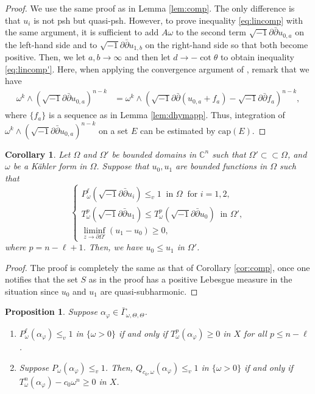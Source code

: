 \documentclass{amsart}
\numberwithin{equation}{section}
\theoremstyle{plain}
\newtheorem{cor}[equation]{Corollary}
\newtheorem{prop}[equation]{Proposition}
\theoremstyle{definition}
\theoremstyle{remark}
\newcommand{\delb}{\sqrt{-1}\partial\bar{\partial}}
\begin{document}
\begin{proof}
    We use the same proof as in Lemma \ref{lem:comp}. 
    The only difference is that $u_i$ is not psh but quasi-psh. However, to prove inequality \eqref{eq:lincomp} with the same argument, it is sufficient to add $A\omega$ to the second term $\delb u_{0,a}$ on the left-hand side and to $\delb u_{1,b}$ on the right-hand side so that both become positive. Then, we let $a,b\to\infty$ and then let $d\to-\cot\theta$ to obtain inequality \eqref{eq:lincomp'}. Here, when applying the convergence argument of \cite[Theorem 4.1]{BT}, remark that we have
    \begin{align*}
        \omega^k\wedge(\delb u_{0,a})^{n-k}
        &=\omega^k\wedge(\delb (u_{0,a}+f_a)-\delb f_a)^{n-k},
    \end{align*}
    where $\{f_a\}$ is a sequence as in Lemma \ref{lem:dhymapp}. Thus, integration of $\omega^k\wedge(\delb u_{0,a})^{n-k}$ on a set $E$ can be estimated by $\mathrm{cap}(E)$. 
\end{proof}

\begin{cor}\label{cor:dhymcomp}
    Let $\Omega$ and $\Omega'$ be bounded domains in $\mathbb{C}^n$ such that $\Omega'\subset\subset\Omega$, and $\omega$ be a Kähler form in $\Omega$. Suppose that $u_0,u_1$ are bounded functions in $\Omega$ such that 
    \begin{equation*}
        \begin{cases}
            P^{\ell}_\omega(\delb u_i)\le_v1 \ \text{ in }\Omega \ \text{ for } i=1,2,\\
            T^p_\omega(\delb u_1)\le T^p_\omega(\delb u_0) \ \text{ in }\Omega',\\
            \liminf_{z\to\partial\Omega'} (u_1-u_0)\ge 0,
        \end{cases}
    \end{equation*}
    where $p=n-\ell+1$. Then, we have $u_0\le u_1$ in $\Omega'$.
\end{cor}

\begin{proof}
    The proof is completely the same as that of Corollary \ref{cor:comp}, once one notifies that the set $S$ as in the proof has a positive Lebesgue measure in the situation since $u_0$ and $u_1$ are quasi-subharmonic.
\end{proof}

\begin{prop}\label{prop:dhymviscpp}
    Suppose $\alpha_\varphi\in\bar{\Gamma}_{\omega,\Theta,\Theta}$.
    \begin{enumerate}[label={\upshape(\roman*)}]
        \item\label{item:dhymposin-1} 
        $P^\ell_{\omega}(\alpha_\varphi)\le_v 1$ in $\{\omega>0\}$ if and only if $T^p_\omega(\alpha_\varphi)\ge0$ in $X$ for all $p\le n-\ell$.
        \item\label{item:dhymposin} 
        Suppose $P_{\omega}(\alpha_\varphi)\le_v 1$. Then, $Q_{c_0,\omega}(\alpha_\varphi)\le_v 1$ in $\{\omega>0\}$ if and only if $T^n_\omega(\alpha_\varphi)-c_0\omega^n\ge0$ in $X$.
    \end{enumerate}
\end{prop}
\end{document}

